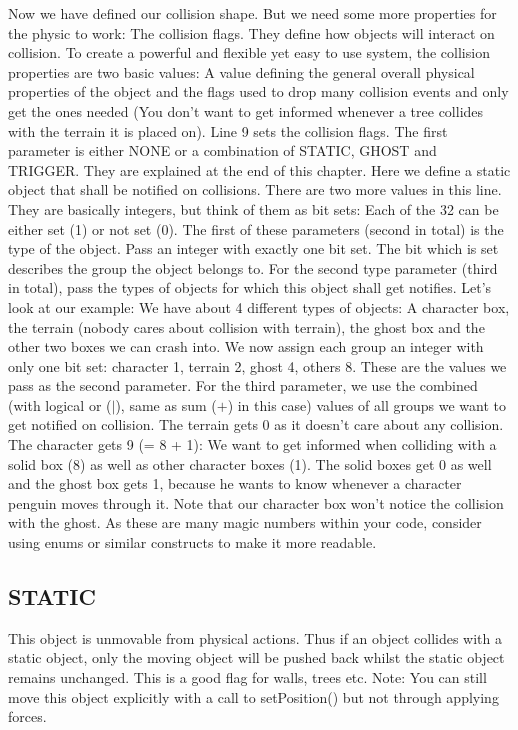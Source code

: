 \documentclass{article}
\begin{document}
Now we have defined our collision shape. But we need some more properties for the physic to work: The collision flags. They define how objects will interact on collision. To create a powerful and flexible yet easy to use system, the collision properties are two basic values: A value defining the general overall physical properties of the object and the flags used to drop many collision events and only get the ones needed (You don't want to get informed whenever a tree collides with the terrain it is placed on). Line 9 sets the collision flags. The first parameter is either NONE or a combination of STATIC, GHOST and TRIGGER. They are explained at the end of this chapter. Here we define a static object that shall be notified on collisions.\newline
There are two more values in this line. They are basically integers, but think of them as bit sets: Each of the 32 can be either set (1) or not set (0). The first of these parameters (second in total) is the type of the object. Pass an integer with exactly one bit set. The bit which is set describes the group the object belongs to. For the second type parameter (third in total), pass the types of objects for which this object shall get notifies. Let's look at our example: We have about 4 different types of objects: A character box, the terrain (nobody cares about collision with terrain), the ghost box and the other two boxes we can crash into. We now assign each group an integer with only one bit set: character 1, terrain 2, ghost 4, others 8. These are the values we pass as the second parameter. For the third parameter, we use the combined (with logical or ($|$), same as sum ($+$) in this case) values of all groups we want to get notified on collision. The terrain gets 0 as it doesn't care about any collision. The character gets 9 (= 8 + 1): We want to get informed when colliding with a solid box (8) as well as other character boxes (1). The solid boxes get 0 as well and the ghost box gets 1, because he wants to know whenever a character penguin moves through it. Note that our character box won't notice the collision with the ghost. As these are many magic numbers within your code, consider using enums or similar constructs to make it more readable.\newline

\subsection{STATIC}

This object is unmovable from physical actions. Thus if an object collides with a static object, only the moving object will be pushed back whilst the static object remains unchanged. This is a good flag for walls, trees etc. Note: You can still move this object explicitly with a call to setPosition() but not through applying forces.
\end{document}
